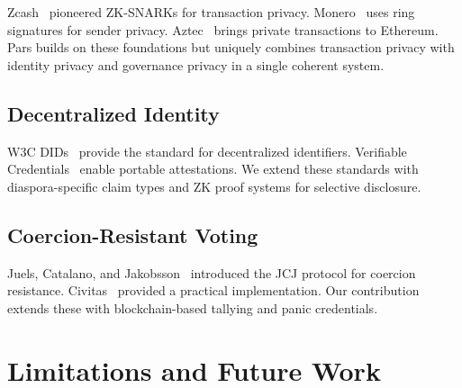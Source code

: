 \documentclass[11pt,a4paper]{article}
\begin{document}
Zcash~\cite{sasson2014zerocash} pioneered ZK-SNARKs for transaction privacy.
Monero~\cite{noether2016ring} uses ring signatures for sender privacy.
Aztec~\cite{williamson2018aztec} brings private transactions to Ethereum.
Pars builds on these foundations but uniquely combines transaction privacy with identity privacy and governance privacy in a single coherent system.

\subsection{Decentralized Identity}

W3C DIDs~\cite{reed2020decentralized} provide the standard for decentralized identifiers.
Verifiable Credentials~\cite{sporny2019verifiable} enable portable attestations.
We extend these standards with diaspora-specific claim types and ZK proof systems for selective disclosure.

\subsection{Coercion-Resistant Voting}

Juels, Catalano, and Jakobsson~\cite{juels2005coercion} introduced the JCJ protocol for coercion resistance.
Civitas~\cite{clarkson2008civitas} provided a practical implementation.
Our contribution extends these with blockchain-based tallying and panic credentials.

\section{Limitations and Future Work}
\label{sec:limitations}
\end{document}
